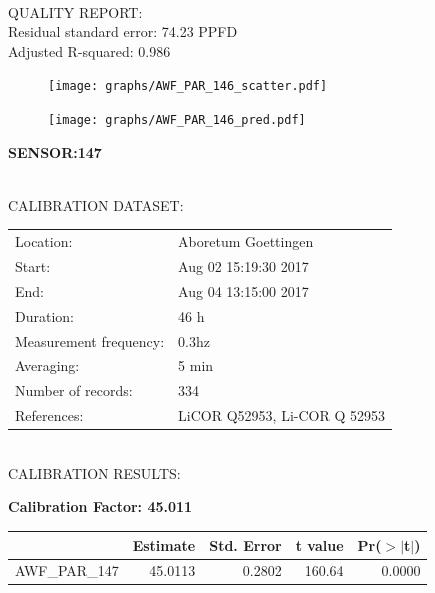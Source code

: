 \documentclass[oneside]{report}
\begin{document}
\hrulefill\\
QUALITY REPORT:\\
Residual standard error: 74.23 PPFD\\
Adjusted R-squared: 0.986



\begin{figure}[H]
  \centering
  \texttt{[image: graphs/AWF\_PAR\_146\_scatter.pdf]}
\end{figure}




\begin{figure}[H]
  \centering
  \texttt{[image: graphs/AWF\_PAR\_146\_pred.pdf]}
\end{figure}

\pagebreak


\begin{center}
\large{\textbf{SENSOR:147}}\\
\end{center}

\hrulefill\\
CALIBRATION DATASET:\\
\begin{table}[h!]
  \centering
  \label{tab:table1}
  \begin{tabular}{ll}
    Location: & Aboretum Goettingen\\ 
    
    
    Start:  & Aug 02 15:19:30 2017 \\
    End:   & Aug 04 13:15:00 2017\\ 
    Duration: & 46 h\\
    Measurement frequency: & 0.3hz\\
    Averaging:  &5 min\\
    Number of records: & 334 \\
    References: & LiCOR Q52953, Li-COR Q 52953 \\
  \end{tabular}
\end{table}

\hrulefill\\
CALIBRATION RESULTS:\\


\begin{center}
\textbf{\large{Calibration Factor: 45.011}}\\
\end{center}
\begin{table}[ht]
\centering
\begin{tabular}{rrrrr}
  \hline
 & Estimate & Std. Error & t value & Pr($>$$|$t$|$) \\ 
  \hline
AWF\_PAR\_147 & 45.0113 & 0.2802 & 160.64 & 0.0000 \\ 
   \hline
\end{tabular}
\end{table}
\end{document}
